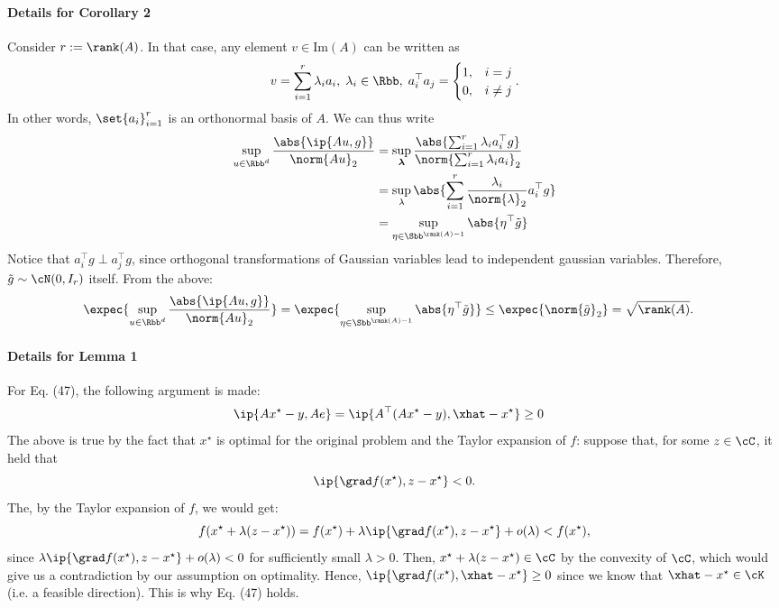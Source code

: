 \documentclass[a4paper]{article}
\newcommand{\xstar}{x^{\star}}
\begin{document}
\paragraph{Details for Corollary 2}
Consider $r := \rank(A)$. In that case, any element $v \in \mathrm{Im}(A)$ can
be written as
\[
    v = \sum_{i=1}^{r} \lambda_i a_i, \; \lambda_i \in \Rbb,
    \; a_i^\top a_j = \begin{cases}
        1, & i = j \\
        0, & i \neq j
    \end{cases}.
\]
In other words, $\set{a_i}_{i=1}^r$ is an orthonormal basis of $A$. We can thus
write
\begin{align*}
    \sup_{u \in \Rbb^d} \frac{\abs{\ip{Au, g}}}{\norm{Au}_2} &=
    \sup_{\bm{\lambda}} \frac{\abs{\sum_{i=1}^r \lambda_i a_i^\top g}}{
        \norm{\sum_{i=1}^r \lambda_i a_i}_2} \\
    &= \sup_{\lambda}
        \abs{\sum_{i=1}^r \frac{\lambda_i}{\norm{\lambda}_2} a_i^\top g} \\
    &= \sup_{\eta \in \Sbb^{\rank(A) - 1}} \abs{\eta^\top \tilde{g}}
\end{align*}
Notice that $a_i^\top g \perp a_j^\top g$, since orthogonal transformations of
Gaussian variables lead to independent gaussian variables. Therefore,
$\tilde{g} \sim \cN(0, I_r)$ itself. From the above:
\begin{align*}
    \expec{\sup_{u \in \Rbb^d} \frac{\abs{\ip{Au, g}}}{\norm{Au}_2}} &=
    \expec{\sup_{\eta \in \Sbb^{\rank(A) - 1}} \abs{\eta^\top \tilde{g}}} \leq
    \expec{\norm{\tilde{g}}_2} =
    \sqrt{\rank(A)}.
\end{align*}

\paragraph{Details for Lemma 1}
For Eq. (47), the following argument is made:
\begin{align*}
    \ip{A\xstar - y, Ae} &= \ip{A^\top (A\xstar - y), \xhat - \xstar} \geq 0
\end{align*}
The above is true by the fact that $\xstar$ is optimal for the
original problem and the Taylor expansion of $f$: suppose that, for some $z \in
\cC$, it held that
\[
    \ip{\grad f(\xstar), z - \xstar} < 0.
\]
The, by the Taylor expansion of $f$, we would get:
\[
    f(\xstar + \lambda (z - \xstar)) =
    f(\xstar) + \lambda \ip{\grad f(\xstar), z - \xstar} + o(\lambda)
    < f(\xstar),
\]
since $\lambda \ip{\grad f(\xstar), z - \xstar} + o(\lambda) < 0$ for
sufficiently small $\lambda > 0$. Then, $\xstar + \lambda (z - \xstar) \in \cC$
by the convexity of $\cC$, which would give us a contradiction by our assumption
on optimality. Hence, $\ip{\grad f(\xstar), \xhat - \xstar} \geq 0$ since we
know that $\xhat - \xstar \in \cK$ (i.e. a feasible direction).
This is why Eq. (47) holds.
\end{document}
